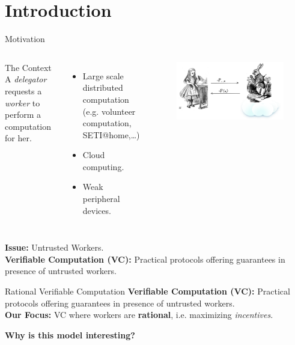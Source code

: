 \section{Introduction}

\begin{frame}{Motivation}

\begin{columns}
\begin{block}{The Context}
	A \textit{delegator} requests a \textit{worker} to perform a computation for her.
\end{block}
\onslide<+->
\begin{itemize}[<+- | alert@+>]
	\item Large scale distributed computation (e.g. volunteer computation, SETI@home,\dots)
	\item Cloud computing.
	\item Weak peripheral devices.
\end{itemize}
\begin{figure}
	\includegraphics[scale=0.17]{pics/alice.png}
\end{figure}
\end{columns}
\pause
\bigskip
\textbf{Issue: } Untrusted Workers.\\
\pause
\medskip
\textbf{Verifiable Computation (VC):} Practical protocols offering guarantees in presence of untrusted workers.
\end{frame}

\begin{frame}[t]{Rational Verifiable Computation}
\textbf{Verifiable Computation (VC):} Practical protocols offering guarantees in presence of untrusted workers.\\ \pause
\vspace{1.6cm}
{\large \textbf{Our Focus: } VC where workers are \textbf{rational}, \pause i.e. maximizing \textit{incentives}.} \pause

\vspace{1.3cm}
\textbf{Why is this model interesting?}


\end{frame}


